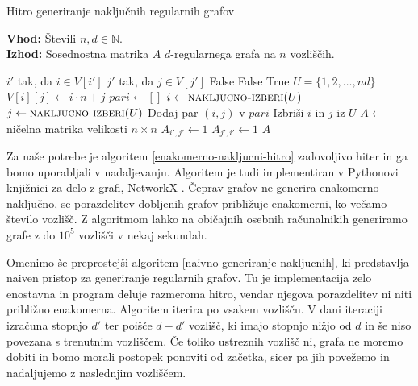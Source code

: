 \begin{algorithm}[t]
    \caption{Hitro generiranje naključnih regularnih grafov}
    \label{enakomerno-nakljucni-hitro}
    \raggedright
    \textbf{Vhod:} Števili \(n, d \in \mathbb N\). \\
    \textbf{Izhod:} Sosednostna matrika \(A\) \(d\)-regularnega grafa na \(n\) vozliščih.
    \begin{algorithmic}[1]
        \State \(i'\) tak, da \(i\in V[i']\)
        \State \(j'\) tak, da \(j\in V[j']\)
        \State \Return False 
        \EndIf
        \State \Return False 
        \EndIf
        \State \Return True
        \EndFunction
        \State \(U = \{1, 2, \ldots, nd\}\) 
        \State \(V[i][j] \gets i\cdot n + j\) 
        \EndFor
        \EndFor
        \State \(pari \gets []\)
        \State \(i\gets \Call{nakljucno-izberi}{U}\)
        \State \(j\gets \Call{nakljucno-izberi}{U}\)
        \State Dodaj par \((i, j)\) v \(pari\)
        \State Izbriši \(i\) in \(j\) iz \(U\)
        \EndIf
        \EndWhile
        \State \(A \gets\) ničelna matrika velikosti \(n \times n\)
        \State \(A_{i', j'} \gets 1\)
        \State \(A_{j', i'} \gets 1\)
        \EndFor
        \State \Return $A$
        \EndFunction
    \end{algorithmic}
\end{algorithm}

Za naše potrebe je algoritem \ref{enakomerno-nakljucni-hitro} zadovoljivo hiter in ga bomo uporabljali v nadaljevanju. Algoritem je tudi implementiran v Pythonovi knjižnici za delo z grafi, NetworkX \cite{networkx}. Čeprav grafov ne generira enakomerno naključno, se porazdelitev dobljenih grafov približuje enakomerni, ko večamo število vozlišč. Z algoritmom lahko na običajnih osebnih računalnikih generiramo grafe z do \(10^5\) vozlišči v nekaj sekundah.

Omenimo še preprostejši algoritem \ref{naivno-generiranje-nakljucnih}, ki predstavlja naiven pristop za generiranje regularnih grafov. Tu je implementacija zelo enostavna in program deluje razmeroma hitro, vendar njegova porazdelitev ni niti približno enakomerna. Algoritem iterira po vsakem vozlišču. V dani iteraciji izračuna stopnjo \(d'\) ter poišče \(d-d'\) vozlišč, ki imajo stopnjo nižjo od \(d\) in še niso povezana s trenutnim vozliščem. Če toliko ustreznih vozlišč ni, grafa ne moremo dobiti in bomo morali postopek ponoviti od začetka, sicer pa jih povežemo in nadaljujemo z naslednjim vozliščem. 

